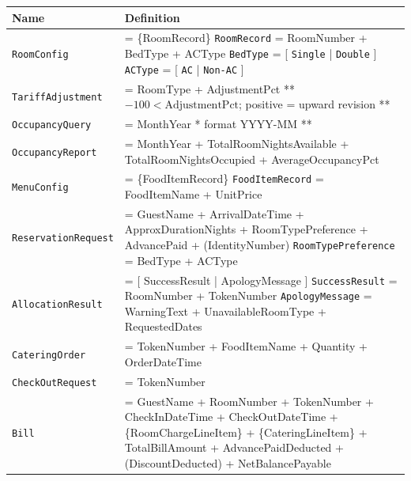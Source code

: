 \documentclass[12pt,a4paper]{article}
\renewcommand{\thead}[1]{%
  \cellcolor{tableheadbg}\color{white}\textbf{#1}%
}
\begin{document}
\begin{longtable}{|L{3.8cm}|L{10cm}|}
  \hline
  \thead{Name} & \thead{Definition} \\
  \hline
  \endhead
  \hline
  \endfoot
  \texttt{RoomConfig}
    & = \{RoomRecord\} \newline
      \texttt{RoomRecord} = RoomNumber + BedType + ACType \newline
      \texttt{BedType} = [ \texttt{Single} | \texttt{Double} ] \newline
      \texttt{ACType} = [ \texttt{AC} | \texttt{Non-AC} ] \\
  \hline
  \texttt{TariffAdjustment}
    & = RoomType + AdjustmentPct \qquad
      ** $-100 < \text{AdjustmentPct}$; positive = upward revision ** \\
  \hline
  \texttt{OccupancyQuery}
    & = MonthYear \qquad ** format YYYY-MM ** \\
  \hline
  \texttt{OccupancyReport}
    & = MonthYear + TotalRoomNightsAvailable + TotalRoomNightsOccupied
        + AverageOccupancyPct \\
  \hline
  \texttt{MenuConfig}
    & = \{FoodItemRecord\} \newline
      \texttt{FoodItemRecord} = FoodItemName + UnitPrice \\
  \hline
  \texttt{ReservationRequest}
    & = GuestName + ArrivalDateTime + ApproxDurationNights + RoomTypePreference
        + AdvancePaid + (IdentityNumber) \newline
      \texttt{RoomTypePreference} = BedType + ACType \\
  \hline
  \texttt{AllocationResult}
    & = [ SuccessResult | ApologyMessage ] \newline
      \texttt{SuccessResult} = RoomNumber + TokenNumber \newline
      \texttt{ApologyMessage} = WarningText + UnavailableRoomType + RequestedDates \\
  \hline
  \texttt{CateringOrder}
    & = TokenNumber + FoodItemName + Quantity + OrderDateTime \\
  \hline
  \texttt{CheckOutRequest}
    & = TokenNumber \\
  \hline
  \texttt{Bill}
    & = GuestName + RoomNumber + TokenNumber + CheckInDateTime + CheckOutDateTime
        + \{RoomChargeLineItem\} + \{CateringLineItem\} + TotalBillAmount
        + AdvancePaidDeducted + (DiscountDeducted) + NetBalancePayable \newline

\end{longtable}
\end{document}
